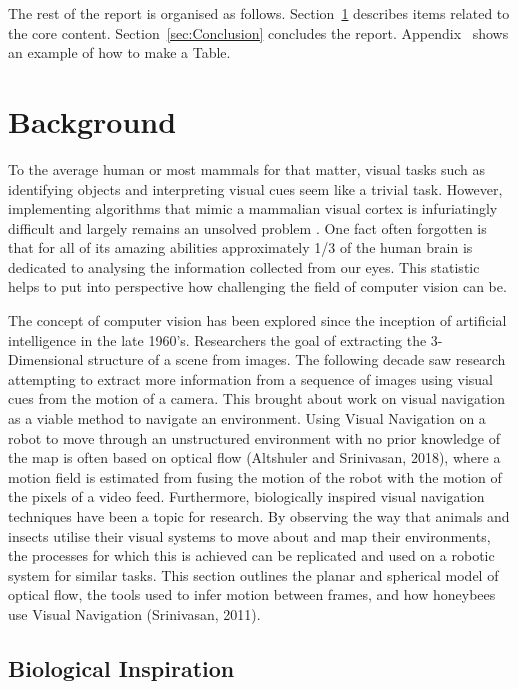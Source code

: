 \documentclass{UoNMCHA}
\numberwithin{equation}{section}
\begin{document}
The rest of the report is organised as follows. Section~\ref{sec:Background} describes items related to the core content. Section~\ref{sec:Conclusion} concludes the report. Appendix~ shows an example of how to make a Table.

\section{Background}\label{sec:Background}
To the average human or most mammals for that matter, visual tasks such as identifying objects and interpreting visual cues seem like a trivial task. However, implementing algorithms that mimic a mammalian visual cortex is infuriatingly difficult and largely remains an unsolved problem \citep{hartley2003multiple}. One fact often forgotten is that for all of its amazing abilities approximately 1/3 of the human brain is dedicated to analysing the information collected from our eyes. This statistic helps to put into perspective how challenging the field of computer vision can be.

The concept of computer vision has been explored since the inception of artificial intelligence in the late 1960’s. Researchers the goal of extracting the 3-Dimensional structure of a scene from images. The following decade saw research attempting to extract more information from a sequence of images using visual cues from the motion of a camera. This brought about work on visual navigation as a viable method to navigate an environment. Using Visual Navigation on a robot to move through an unstructured environment with no prior knowledge of the map is often based on optical flow (Altshuler and Srinivasan, 2018), where a motion field is estimated from fusing the motion of the robot with the motion of the pixels of a video feed. Furthermore, biologically inspired visual navigation techniques have been a topic for research. By observing the way that animals and insects utilise their visual systems to move about and map their environments, the processes for which this is achieved can be replicated and used on a robotic system for similar tasks. This section outlines the planar and spherical model of optical flow, the tools used to infer motion between frames, and how honeybees use Visual Navigation (Srinivasan, 2011).
\subsection{Biological Inspiration} %
\end{document}

